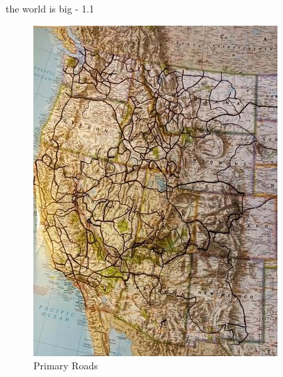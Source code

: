 \documentclass[
  ignorenonframetext,
]{beamer}
\begin{document}
\begin{frame}{the world is big - 1.1}
\protect\hypertarget{the-world-is-big---1.1}{}
\begin{figure}
\centering
\includegraphics{../graphics/pictures/major_roads.resized.jpg}
\caption{Primary Roads}
\end{figure}
\end{frame}
\end{document}
